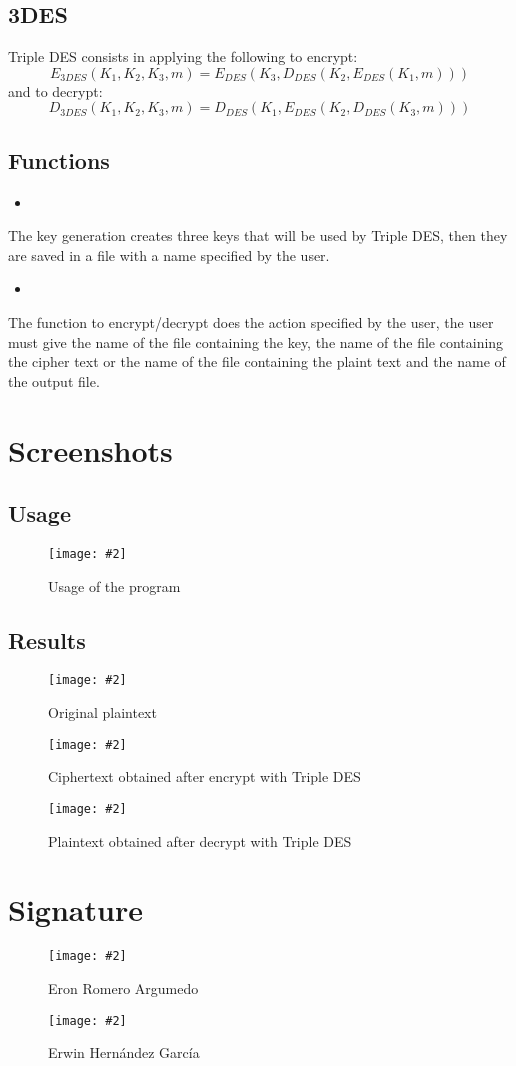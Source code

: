\documentclass[titlepage, 12pt]{article}
\numberwithin{equation}{section}%
\numberwithin{figure}{section}%
\numberwithin{table}{section}%
\newcommand{\imagen}[4][]{
	\begin{figure}[H]
		\centering
		\texttt{[image: \#2]}
		\caption{#3}
		#4
	\end{figure}
}
\newcommand{\delimitCodeScript}[6][]{
	\begin{itemize}
		\item[]
	\end{itemize}	
}
\begin{document}
		\subsection{3DES}
		Triple DES consists in applying the following to encrypt:
		\begin{equation*}
			E_{3DES}(K_1, K_2, K_3, m) = E_{DES}(K_3, D_{DES}(K_2, E_{DES}(K_1, m)))
		\end{equation*}
		and to decrypt:
		\begin{equation*}
			D_{3DES}(K_1, K_2, K_3, m) = D_{DES}(K_1, E_{DES}(K_2, D_{DES}(K_3, m)))
		\end{equation*}
		\cite{feistel}
	\begin{landscape}
			\section{Functions}
			\delimitCodeScript{c}{TripleDES/TripleDES}{Key generation}{77}{101}
			The key generation creates three keys that will be used by Triple DES, then they are saved in a file with a name specified by the user.
			\linebreak
			\delimitCodeScript{c}{TripleDES/TripleDES}{Encrypt/Decrypt}{106}{226}
			The function to encrypt/decrypt does the action specified by the user, the user must give the name of the file containing the key, the name of the file containing the cipher text or the name of the file containing the plaint text  and the name of the output file.
	\end{landscape}
		
	\section{Screenshots}
		\subsection{Usage}
		\imagen[width=\linewidth]{Usage.png}{Usage of the program}{\label{Usage}}
		\subsection{Results}
		\imagen[width=\linewidth]{PlainText.png}{Original plaintext}{\label{Plaintext}}
		\imagen[width=\linewidth]{Encrypt.png}{Ciphertext obtained after encrypt with Triple DES}{\label{Ciphertext1}}
		\imagen[width=\linewidth]{Decrypt.png}{Plaintext obtained after decrypt with Triple DES}{\label{Ciphertext2}}	
	\section{Signature}
	\newpage
	\imagen[width=\linewidth]{Firma1}{Eron Romero Argumedo}{\label{Eron}}
	\imagen[height=\textheight]{Firma2}{Erwin Hernández García}{\label{Erwin}}
	
	
\end{document}
